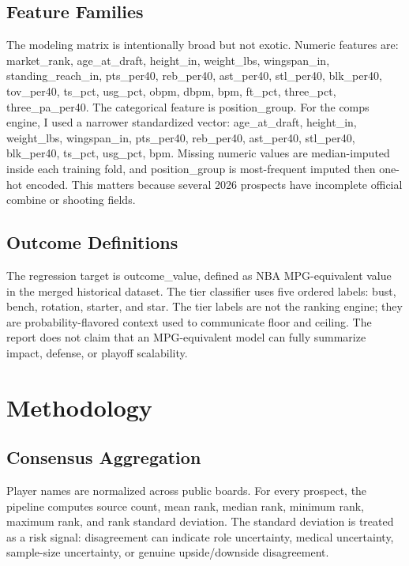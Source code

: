 \documentclass[11pt]{article}
\begin{document}
\subsection{Feature Families}

The modeling matrix is intentionally broad but not exotic. Numeric features are: market\_rank, age\_at\_draft, height\_in, weight\_lbs, wingspan\_in, standing\_reach\_in, pts\_per40, reb\_per40, ast\_per40, stl\_per40, blk\_per40, tov\_per40, ts\_pct, usg\_pct, obpm, dbpm, bpm, ft\_pct, three\_pct, three\_pa\_per40. The categorical feature is position\_group. For the comps engine, I used a narrower standardized vector: age\_at\_draft, height\_in, weight\_lbs, wingspan\_in, pts\_per40, reb\_per40, ast\_per40, stl\_per40, blk\_per40, ts\_pct, usg\_pct, bpm. Missing numeric values are median-imputed inside each training fold, and position\_group is most-frequent imputed then one-hot encoded. This matters because several 2026 prospects have incomplete official combine or shooting fields.

\subsection{Outcome Definitions}

The regression target is outcome\_value, defined as NBA MPG-equivalent value in the merged historical dataset. The tier classifier uses five ordered labels: bust, bench, rotation, starter, and star. The tier labels are not the ranking engine; they are probability-flavored context used to communicate floor and ceiling. The report does not claim that an MPG-equivalent model can fully summarize impact, defense, or playoff scalability.

\section{Methodology}

\subsection{Consensus Aggregation}

Player names are normalized across public boards. For every prospect, the pipeline computes source count, mean rank, median rank, minimum rank, maximum rank, and rank standard deviation. The standard deviation is treated as a risk signal: disagreement can indicate role uncertainty, medical uncertainty, sample-size uncertainty, or genuine upside/downside disagreement.
\end{document}
